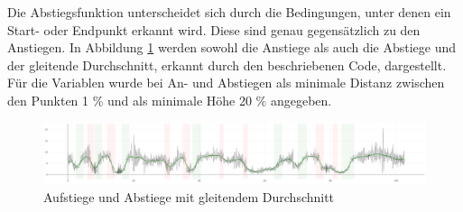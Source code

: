 Die Abstiegsfunktion unterscheidet sich durch die Bedingungen, unter denen ein Start- oder Endpunkt erkannt wird. Diese sind genau gegensätzlich zu den Anstiegen. In Abbildung \ref{fig:risesAndFalls} werden sowohl die Anstiege als auch die Abstiege und der gleitende Durchschnitt, erkannt durch den beschriebenen Code, dargestellt. Für die Variablen wurde bei An- und Abstiegen als minimale Distanz zwischen den Punkten 1 \% und als minimale Höhe 20 \% angegeben. 
\begin{figure}[h!]
\centering
\includegraphics[width=\textwidth]{gfx/falls_rises_movingAverage.png}
\caption{Aufstiege und Abstiege mit gleitendem Durchschnitt}
\label{fig:risesAndFalls}
\end{figure}


